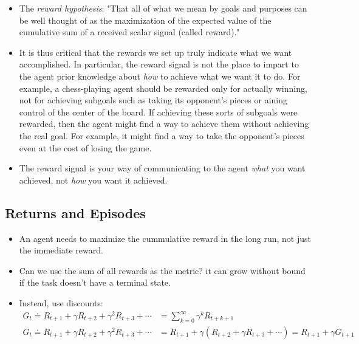 \begin{itemize}
    \item The \textit{reward hypothesis}: "That all of what we mean by goals and purposes can be well thought of as
    the maximization of the expected value of the cumulative sum of a received
    scalar signal (called reward)."
    \item It is thus critical that the rewards we set up truly indicate what we want accomplished.
    In particular, the reward signal is not the place to impart to the agent prior knowledge
    about \textit{how} to achieve what we want it to do. For example, a chess-playing agent should
    be rewarded only for actually winning, not for achieving subgoals such as taking its
    opponent's pieces or aining control of the center of the board. If achieving these sorts
    of subgoals were rewarded, then the agent might find a way to achieve them without
    achieving the real goal. For example, it might find a way to take the opponent's pieces
    even at the cost of losing the game. 
    \item The reward signal is your way of communicating to
    the agent \textit{what} you want achieved, not \textit{how} you want it achieved.
\end{itemize}






\subsection{Returns and Episodes}

\begin{itemize}
\item An agent needs to maximize the cummulative reward in the long run, not just the immediate reward. 
\item Can we use the sum of all rewards as the metric? it can grow without bound if the task doesn't have a terminal state.
\item Instead, use discounts: 
\subitem 
\begin{align}
    G_t \doteq R_{t+1} + \gamma R_{t+2} + \gamma^2 R_{t+3} + \dotsb &= \sum_{k=0}^{\infty} \gamma^k R_{t+k+1} \\     \label{eq:G_definition}
    G_t \doteq R_{t+1} + \gamma R_{t+2} + \gamma^2 R_{t+3} + \dotsb &= R_{t+1} + \gamma (R_{t+2} + \gamma R_{t+3} + \dotsb) = R_{t+1} + \gamma G_{t+1} 
\end{align}
\end{itemize}

